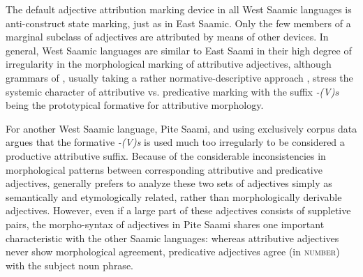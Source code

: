 The default adjective attribution marking device in all West Saamic languages is anti\hyp{}construct state marking, just as in East Saamic. Only the few members of a marginal subclass of adjectives are attributed by means of other devices. In general, West Saamic languages are similar to East Saami in their high degree of irregularity in the morphological marking of attributive adjectives, although grammars of , usually taking a rather normative-descriptive approach \citep[e.g.]{nickel1990,sammallahti1998b,svonni2009a}, stress the systemic character of attributive vs. predicative marking with the suffix \textit{-(V)s} being the prototypical  formative for attributive morphology.

For another West Saamic language, Pite Saami, and using exclusively corpus data \citet[128–129]{wilbur2014a} argues that the formative \textit{-(V)s} is used much too irregularly to be considered a productive attributive suffix. Because of the considerable inconsistencies in morphological patterns between corresponding attributive and predicative adjectives, \cite[134]{wilbur2014a} generally prefers to analyze these two sets of adjectives simply as semantically and etymologically related, rather than morphologically derivable adjectives. However, even if a large part of these adjectives consists of suppletive pairs, the morpho-syntax of adjectives in Pite Saami shares one important characteristic with the other Saamic languages: whereas attributive adjectives never show morphological agreement, predicative adjectives agree (in \textsc{number}) with the subject noun phrase.

